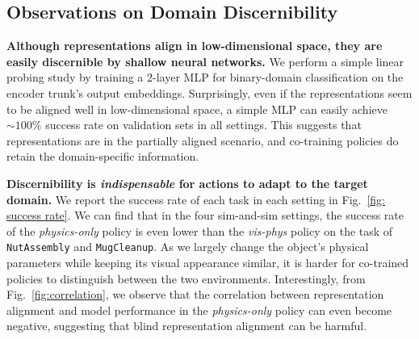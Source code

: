 \subsection{Observations on Domain Discernibility}
\label{sec:discernibility}

\textbf{Although representations align in low-dimensional space, they are easily discernible by shallow neural networks.}
We perform a simple linear probing study by training a 2-layer MLP for binary-domain classification on the encoder trunk's output embeddings.
Surprisingly, even if the representations seem to be aligned well in low-dimensional space, a simple MLP can easily achieve $\sim100\%$ success rate on validation sets in all settings.
This suggests that representations are in the partially aligned scenario, and co-training policies do retain the domain-specific information.

\textbf{Discernibility is \textit{indispensable} for actions to adapt to the target domain.}
We report the success rate of each task in each setting in Fig.~\ref{fig: success rate}.
We can find that in the four sim-and-sim settings, the success rate of the \textit{physics-only} policy is even lower than the \textit{vis-phys} policy on the task of \texttt{NutAssembly} and \texttt{MugCleanup}.
As we largely change the object's physical parameters while keeping its visual appearance similar, it is harder for co-trained policies to distinguish between the two environments.
Interestingly, from Fig.~\ref{fig:correlation}, we observe that the correlation between representation alignment and model performance in the \textit{physics-only} policy can even become negative, suggesting that blind representation alignment can be harmful.





